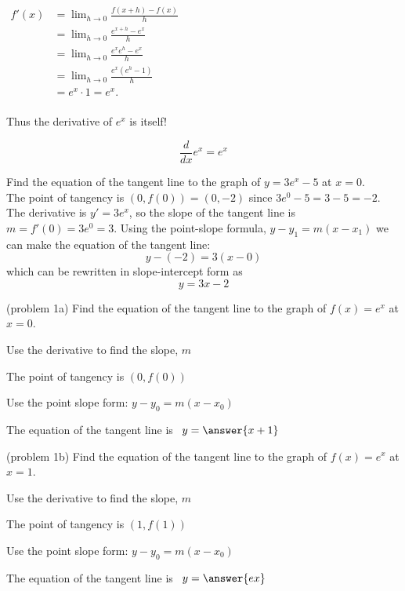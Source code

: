 \documentclass[handout]{ximera}
\begin{document}
\begin{center}
$\begin{aligned}
f'(x) &= \lim_{h \to 0} \frac{f(x+h)-f(x)}{h} \\[5pt]
&= \lim_{h \to 0}\frac{e^{x+h}-e^x}{h}\\[5pt]
&= \lim_{h \to 0} \frac{e^x e^h-e^x}{h}\\[5pt]
&= \lim_{h \to 0} \frac{e^x (e^h-1)}{h}\\[5pt]
&= e^x \cdot 1 = e^x.\\[-5pt]
\end{aligned}$
\end{center}

Thus the derivative of $e^x$ is itself!

\begin{proposition}
\[
\frac{d}{dx} e^x = e^x
\]
\end{proposition}


\begin{example}[example 1] Find the equation of the tangent line to the graph of $y = 3e^x - 5$ at $x = 0$.\\
The point of tangency is $(0, f(0)) = (0, -2)$ since $3e^0 -5 = 3-5 = -2$. 
The derivative is $y' = 3e^x$, so the slope of the tangent line is $m = f'(0) = 3e^0 = 3$.
Using the point-slope formula, $y - y_1 = m(x-x_1)$ we can make the equation of the tangent line:
\[
y - (-2) = 3(x-0)
\]
which can be rewritten in slope-intercept form as
\[
y = 3x-2
\]
\end{example}


\begin{problem}(problem 1a)
Find the equation of the tangent line to the graph of $f(x) = e^x$ at $x = 0$.
\begin{hint}
Use the derivative to find the slope, $m$
\end{hint}
\begin{hint}
The point of tangency is $(0, f(0))$
\end{hint}
\begin{hint}
Use the point slope form: $y-y_0 = m(x-x_0)$
\end{hint}

The equation of the tangent line is \ $y = \answer{x+1}$
\end{problem}

\begin{problem}(problem 1b)
Find the equation of the tangent line to the graph of $f(x) = e^x$ at $x = 1$.
\begin{hint}
Use the derivative to find the slope, $m$
\end{hint}
\begin{hint}
The point of tangency is $(1, f(1))$
\end{hint}
\begin{hint}
Use the point slope form: $y-y_0 = m(x-x_0)$
\end{hint}

The equation of the tangent line is \ $y = \answer{ex}$
\end{problem}
\end{document}
